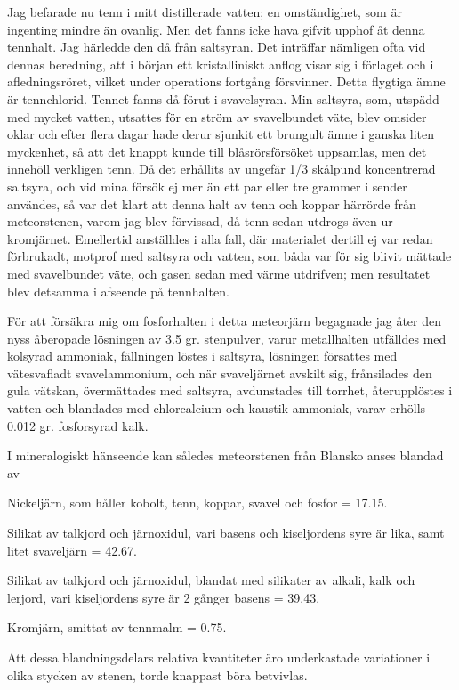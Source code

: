 \documentclass[a4paper, 12pt, oneside, swedish]{article}
\begin{document}
Jag befarade nu tenn i mitt distillerade vatten; en omständighet, som är ingenting mindre än ovanlig. Men det fanns icke hava gifvit upphof åt denna tennhalt. Jag härledde den då från saltsyran. Det inträffar nämligen ofta vid dennas beredning, att i början ett kristalliniskt anflog visar sig i förlaget och i afledningsröret, vilket under operations fortgång försvinner. Detta flygtiga ämne är tennchlorid. Tennet fanns då förut i svavelsyran. Min saltsyra, som, utspädd med mycket vatten, utsattes för en ström av svavelbundet väte, blev omsider oklar och efter flera dagar hade derur sjunkit ett brungult ämne i ganska liten myckenhet, så att det knappt kunde till blåsrörsförsöket uppsamlas, men det innehöll verkligen tenn. Då det erhållits av ungefär 1/3 skålpund koncentrerad saltsyra, och vid mina försök ej mer än ett par eller tre grammer i sender användes, så var det klart att denna halt av tenn och koppar härrörde från meteorstenen, varom jag blev förvissad, då tenn sedan utdrogs även ur kromjärnet. Emellertid anställdes i alla fall, där materialet dertill ej var redan förbrukadt, motprof med saltsyra och vatten, som båda var för sig blivit mättade med svavelbundet väte, och gasen sedan med värme utdrifven; men resultatet blev detsamma i afseende på tennhalten.

För att försäkra mig om fosforhalten i detta meteorjärn begagnade jag åter den nyss åberopade lösningen av 3.5 gr. stenpulver, varur metallhalten utfälldes med kolsyrad ammoniak, fällningen löstes i saltsyra, lösningen försattes med vätesvafladt svavelammonium, och när svaveljärnet avskilt sig, frånsilades den gula vätskan, övermättades med saltsyra, avdunstades till torrhet, återupplöstes i vatten och blandades med chlorcalcium och kaustik ammoniak, varav erhölls 0.012 gr. fosforsyrad kalk.

I mineralogiskt hänseende kan således meteorstenen från Blansko anses blandad av

Nickeljärn, som håller kobolt, tenn, koppar, svavel och fosfor = 17.15.

Silikat av talkjord och järnoxidul, vari basens och kiseljordens syre är lika, samt litet svaveljärn = 42.67.

Silikat av talkjord och järnoxidul, blandat med silikater av alkali, kalk och lerjord, vari kiseljordens syre är 2 gånger basens = 39.43.

Kromjärn, smittat av tennmalm = 0.75.

Att dessa blandningsdelars relativa kvantiteter äro underkastade variationer i olika stycken av stenen, torde knappast böra betvivlas.
\end{document}
